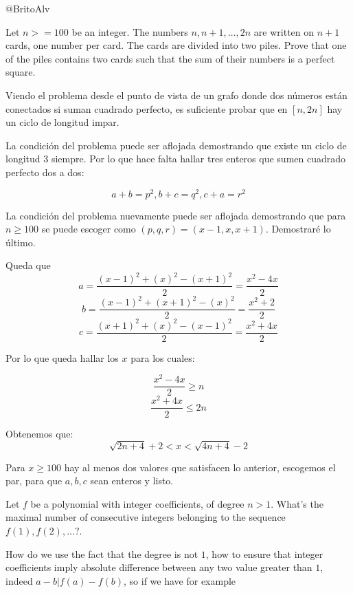 \documentclass[14pt]{extarticle}
\begin{document}
@BritoAlv



\begin{tcolorbox}[colback=blue!5!white,colframe=blue!75!black, title = IMO2021P1]

    Let $n >= 100$  be an integer. The numbers $n, n+1, . . . , 2n$ are written on $n+1$ cards,
    one number per card. The cards are divided into two piles. Prove that one of the
    piles contains two cards such that the sum of their numbers is a perfect square.

\end{tcolorbox}

Viendo el problema desde el punto de vista de un grafo donde dos números están conectados si suman cuadrado perfecto, es suficiente probar que en $[n,2n]$ hay un ciclo de longitud impar.

La condición del problema puede ser aflojada demostrando que existe un ciclo de longitud 3 siempre. Por lo que hace falta hallar tres enteros que sumen cuadrado perfecto dos a dos:

$$a+b = p^2, b+c = q^2, c+a = r^2$$

La condición del problema nuevamente puede ser aflojada demostrando que para $n \geq 100$ se puede escoger como $(p,q,r) = (x-1, x , x+1 )$. Demostraré lo último.

Queda que
$$
    a = \frac{(x-1)^2 + (x)^2 - (x+1)^2}{2} = \frac{x^2-4x}{2}$$
$$
    b  = \frac{(x-1)^2 + (x+1)^2 - (x)^2}{2} = \frac{x^2+2}{2}$$
$$
    c =\frac{(x+1)^2 + (x)^2 - (x-1)^2}{2} = \frac{x^2+4x}{2}
$$

Por lo que queda hallar los $x$ para los cuales:

$$\frac{x^2-4x}{2} \geq n $$
$$\frac{x^2+4x}{2} \leq 2n $$

Obtenemos que:
$$
    \sqrt{2n+4}+2 < x < \sqrt{4n+4}-2
$$

Para $x \geq 100$ hay al menos dos valores que satisfacen lo anterior, escogemos el par, para que $a,b,c$ sean enteros y listo.

\newpage

\begin{tcolorbox}[colback=blue!5!white,colframe=blue!75!black, title = ?]

    Let $f$ be a polynomial with integer coefficients, of degree $n > 1$. What's the maximal number of consecutive integers belonging to the sequence $f(1), f(2), ... ?$.


\end{tcolorbox}

How do we use the fact that the degree is not $1$, how to ensure that integer coefficients imply absolute difference between any two value greater than $1$, indeed $a-b \vert f(a) - f(b)$, so if we have for example 
\end{document}
